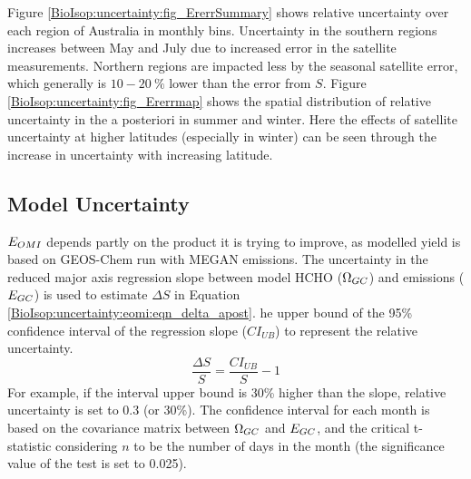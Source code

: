     
    Figure \ref{BioIsop:uncertainty:fig_ErerrSummary} shows relative uncertainty over each region of Australia in monthly bins.
    Uncertainty in the southern regions increases between May and July due to increased error in the satellite measurements.
    Northern regions are impacted less by the seasonal satellite error, which generally is $10-20~\%$ lower than the error from $S$.
    Figure \ref{BioIsop:uncertainty:fig_Ererrmap} shows the spatial distribution of relative uncertainty in the a posteriori in summer and winter.
    Here the effects of satellite uncertainty at higher latitudes (especially in winter) can be seen through the increase in uncertainty with increasing latitude.
    
    
    
    
  \subsection{Model Uncertainty}
    \label{BioIsop:uncertainty:Model}
    
    $E_{OMI}$ depends partly on the product it is trying to improve, as modelled yield is based on GEOS-Chem run with MEGAN emissions.
    The uncertainty in the reduced major axis regression slope between model HCHO ($\Omega_{GC}$) and emissions ($E_{GC}$) is used to estimate $\Delta S$ in Equation \ref{BioIsop:uncertainty:eomi:eqn_delta_apost}.
    he upper bound of the 95\% confidence interval of the regression slope ($CI_{UB}$)  to represent the relative uncertainty.
    \begin{equation}
      \frac{\Delta S}{S} = \frac{CI_{UB}}{S} - 1
    \end{equation}
    For example, if the interval upper bound is 30\% higher than the slope, relative uncertainty is set to 0.3 (or 30\%).
    The confidence interval for each month is based on the covariance matrix between $\Omega_{GC}$ and $E_{GC}$, and the critical t-statistic considering $n$ to be the number of days in the month (the significance value of the test is set to 0.025).
    
